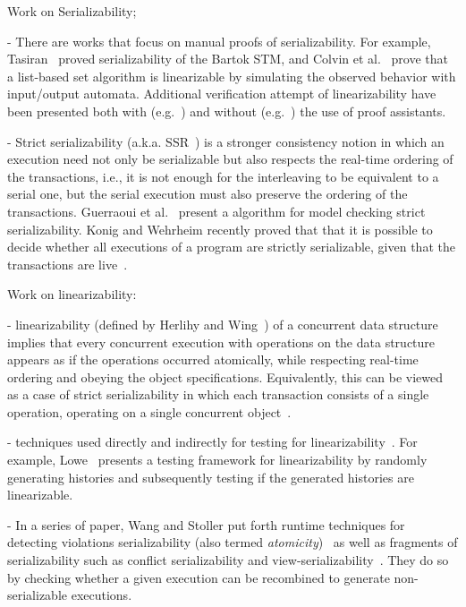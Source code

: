 
Work on Serializability;

- There are works that focus on manual proofs of serializability. For example, Tasiran~\cite{Ta08} proved serializability of the Bartok STM, and Colvin et al.~\cite{CoGrLuMo06} prove that a list-based set algorithm is linearizable by simulating the observed behavior with input/output automata.
Additional verification attempt of linearizability have been presented both with (e.g.~\cite{CoGrLuMo06}) and without (e.g.~\cite{DoGrLuMo04}) the use of proof assistants.

- Strict serializability (a.k.a. SSR~\cite{Pa79}) is a stronger consistency notion in which an execution need not only be serializable but also respects the real-time ordering of the transactions, i.e., it is not enough for the interleaving to be equivalent to a serial one, but the serial execution must also preserve the ordering of the transactions.
%
Guerraoui et al.~\cite{GuHeJoSi08} present a algorithm for model checking strict serializability.
%
Konig and Wehrheim recently proved that that it is possible to decide whether all executions of a program are strictly serializable, given that the transactions are live~\cite{KoWe21}.


Work on linearizability:

- linearizability (defined by Herlihy and Wing~\cite{HeWe87, HeWi90}) of a concurrent data structure implies that every concurrent execution with operations on the data structure appears as if the operations occurred atomically, while respecting real-time ordering and obeying the object specifications. 
%
Equivalently, this can be viewed as a case of strict serializability in which each transaction consists of a single operation, operating on a single concurrent object~\cite{WaSt06a}.




- techniques used directly and indirectly for testing for linearizability~\cite{PrGr12, PrGr13, WiGo93}. For example, Lowe~\cite{Lo17} presents a testing framework for linearizability by randomly generating histories and subsequently testing if the generated histories are linearizable.

- In a series of paper, Wang and Stoller put forth runtime techniques for detecting violations serializability (also termed \textit{atomicity})~\cite{WaSt06a} as well as fragments of serializability such as conflict serializability and view-serializability~\cite{WaSt06b}. They do so by  checking whether a given execution can be recombined to generate non-serializable executions.

